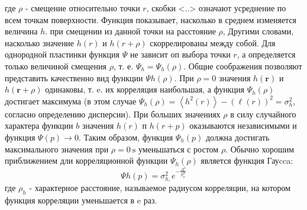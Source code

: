 \documentclass[a4paper, 12pt]{article}%
\begin{document}
где $\rho$ - смещение относительно точки $r$, скобки <..> означают усреднение по всем точкам поверхности. Функция показывает, насколько в среднем изменяется величина $h$. при смещении из данной точки на расстояние $\rho$, Другими словами, насколько значение $h(r)$ и $h(r+\rho)$ скоррелированы между собой. Для однородной пластинки функция $\Psi$ не зависит оп выбора точки $r$, а определяется только величиной смещения $\rho$, т. е. $\Psi_h=\Psi_h(\rho)$. Общие соображения позволяют представить качественно вид функции $\Psi h(\rho)$. При $\rho=0$ значения $h(\boldsymbol{r})$ и $h(\boldsymbol{r}+\rho)$ одинаковы, т. e. их корреляция наибольшая, а функция $\Psi_h(\rho)$ достигает максимума (в этом случае $\Psi_h(\rho)=\left\langle h^2(r)\right\rangle-(\ell(r))^2=\sigma_h^2$, согласно определению дисперсии). При больших значениях $\rho$ в силу случайного характера функции $b$ значения $h(r)$ п $h(r+p)$ оказываются независимыми и функция $\Psi(p) \rightarrow 0$. Таким образом, функция $\Psi_h(p)$ должна достигать максимального значения при $\rho=0 \mathrm{~s}$ уменьшаться с ростом $\rho$. Обычно хорошим приближением дли корреляционной функции $\Psi_h(\rho)$ является функция Гауcca:
$$
\Psi h(p)=\sigma_{h,}^2 e^{-\frac{\Delta^2}{p_h^2}}
$$
где $\rho_h$ - характерное расстояние, называемое радиусом корреляции, на
котором функция корреляции уменьшается в e раз.\\

	
	
\end{document}
